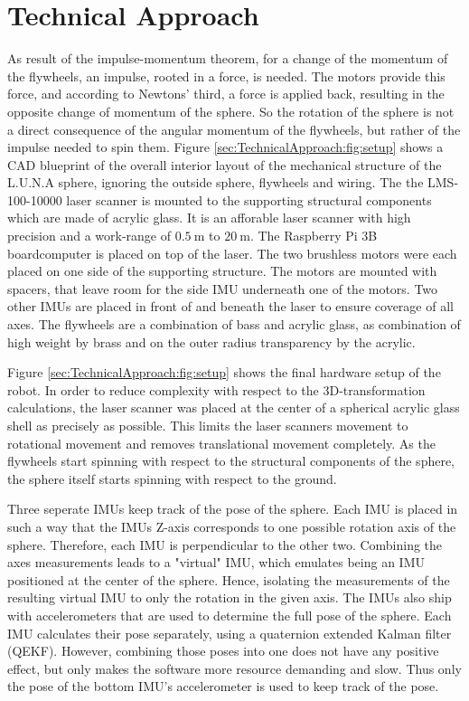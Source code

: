 \section{Technical Approach}
\label{sec:TechnicalApproach}

As result of the impulse-momentum theorem, for a change of the momentum of the flywheels, an impulse, rooted in a force, is needed. 
The motors provide this force, and according to Newtons' third, a force is applied back, resulting in the opposite change of momentum of the sphere. 
So the rotation of the sphere is not a direct consequence of the angular momentum of the flywheels, but rather of the impulse needed to spin them. 
Figure \ref{sec:TechnicalApproach:fig:setup} shows a CAD blueprint of the overall interior layout of the mechanical structure of the L.U.N.A sphere, ignoring the outside sphere, flywheels and wiring.
The the LMS-100-10000 laser scanner is mounted to the supporting structural components which are made of acrylic glass. It is an afforable laser scanner with high precision and a work-range of $\SI{0.5}{\meter}$ to $\SI{20}{\meter}$.
The Raspberry Pi 3B boardcomputer is placed on top of the laser.
The two brushless motors were each placed on one side of the supporting structure. 
The motors are mounted with spacers, that leave room for the side IMU underneath one of the motors. 
Two other IMUs are placed in front of and beneath the laser to ensure coverage of all axes. 
The flywheels are a combination of bass and acrylic glass, as combination of high weight by brass and on the outer radius transparency by the acrylic.


Figure \ref{sec:TechnicalApproach:fig:setup} shows the final hardware setup of the robot.
In order to reduce complexity with respect to the 3D-transformation calculations, the laser scanner was placed at the center of a spherical acrylic glass shell as precisely as possible.
This limits the laser scanners movement to rotational movement and removes translational movement completely. 
As the flywheels start spinning with respect to the structural components of the sphere, the sphere itself starts spinning with respect to the ground. 
                                   

Three seperate IMUs keep track of the pose of the sphere. Each IMU is placed in such a way that the IMUs Z-axis corresponds to one possible rotation axis of the sphere.
Therefore, each IMU is perpendicular to the other two.
Combining the axes measurements leads to a "virtual" IMU, which emulates being an IMU positioned at the center of the sphere. 
Hence, isolating the measurements of the resulting virtual IMU to only the rotation in the given axis.
The IMUs also ship with accelerometers that are used to determine the full pose of the sphere.
Each IMU calculates their pose separately, using a quaternion extended Kalman filter (QEKF).
However, combining those poses into one does not have any positive effect, but only makes the software more resource demanding and slow.
Thus only the pose of the bottom IMU's accelerometer is used to keep track of the pose.

